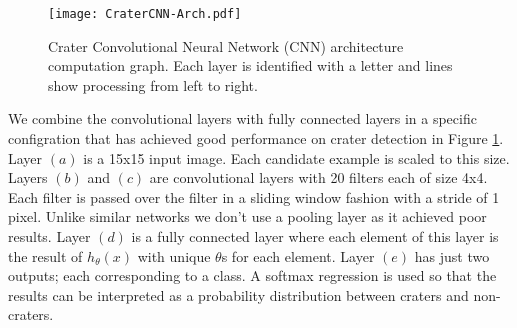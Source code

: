 \documentclass[twoside]{article}
\begin{document}

\begin{figure}[h]
\begin{center}
\vspace{-10pt}
  \texttt{[image: CraterCNN-Arch.pdf]}
  \vspace{-20pt}
  \caption[labelInTOC]{Crater Convolutional Neural Network (CNN) architecture computation graph. Each layer is identified with a letter and lines show processing from left to right.}
  \label{fig:cnnarch}
\end{center}
\vspace{-20pt}
\end{figure}

We combine the convolutional layers with fully connected layers in a specific configration that has achieved good performance on crater detection in Figure \ref{fig:cnnarch}. Layer $(a)$ is a 15x15 input image. Each candidate example is scaled to this size. Layers $(b)$ and $(c)$ are convolutional layers with 20 filters each of size 4x4. Each filter is passed over the filter in a sliding window fashion with a stride of 1 pixel. Unlike similar networks we don't use a pooling layer as it achieved poor results. Layer $(d)$ is a fully connected layer where each element of this layer is the result of $h_\theta(x)$ with unique $\theta$s for each element. Layer $(e)$ has just two outputs; each corresponding to a class. A softmax regression is used so that the results can be interpreted as a probability distribution between craters and non-craters.
\end{document}
